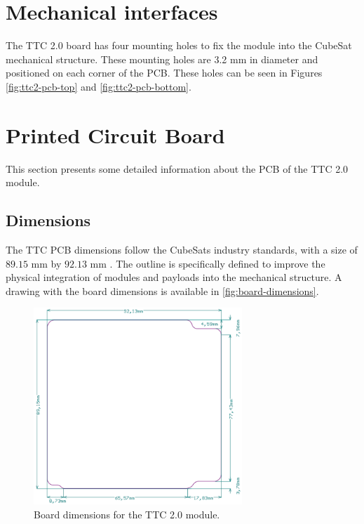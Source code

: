\section{Mechanical interfaces}

The TTC 2.0 board has four mounting holes to fix the module into the CubeSat mechanical structure. These mounting holes are 3.2 mm in diameter and positioned on each corner of the PCB. These holes can be seen in Figures \ref{fig:ttc2-pcb-top} and \ref{fig:ttc2-pcb-bottom}.

\section{Printed Circuit Board}

This section presents some detailed information about the PCB of the TTC 2.0 module.

\subsection{Dimensions}

The TTC PCB dimensions follow the CubeSats industry standards, with a size of $89.15$ mm by $92.13$ mm \cite{nasa-handout}. The outline is specifically defined to improve the physical integration of modules and payloads into the mechanical structure. A drawing with the board dimensions is available in \autoref{fig:board-dimensions}.

\begin{figure}[!ht]
    \begin{center}
        \includegraphics[width=0.7\textwidth]{figures/board-dimensions.png}
        \caption{Board dimensions for the TTC 2.0 module.}
        \label{fig:board-dimensions}
    \end{center}
\end{figure}

